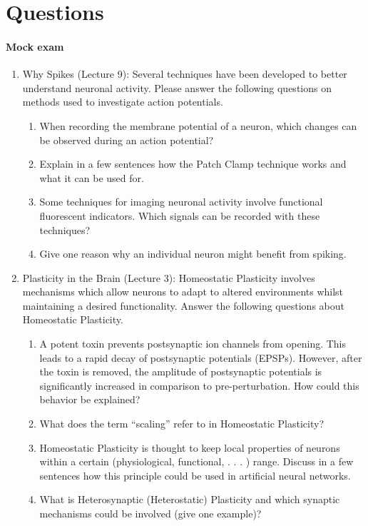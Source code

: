 \documentclass[main]{subfiles}
\begin{document}
\newpage
\appendix
\section{Questions}

\paragraph{Mock exam}


\begin{enumerate}
    \item Why Spikes (Lecture 9):
    Several techniques have been developed to better understand neuronal activity. Please answer the following questions on methods used to investigate action potentials.
  \begin{enumerate}[label*=\arabic*.]
    \item When recording the membrane potential of a neuron, which changes can be observed during an action potential?
    \item Explain in a few sentences how the Patch Clamp technique works and what it can be used for.
    \item Some techniques for imaging neuronal activity involve functional fluorescent indicators. Which signals can be recorded with these techniques?
    \item Give one reason why an individual neuron might benefit from spiking.
  \end{enumerate}

    \item Plasticity in the Brain (Lecture 3):
    Homeostatic Plasticity involves mechanisms which allow neurons to adapt to altered environments whilst maintaining a desired functionality. Answer the following questions about Homeostatic Plasticity.
  \begin{enumerate}[label*=\arabic*.]
    \item A potent toxin prevents postsynaptic ion channels from opening. This leads to a rapid decay of postsynaptic potentials (EPSPs). However, after the toxin is removed, the amplitude of postsynaptic potentials is significantly increased in comparison to pre-perturbation. How could this behavior be explained?
    \item What does the term “scaling” refer to in Homeostatic Plasticity?
    \item Homeostatic Plasticity is thought to keep local properties of neurons within a certain (physiological, functional, . . . ) range. Discuss in a few sentences how this principle could be used in artificial neural networks.
    \item What is Heterosynaptic (Heterostatic) Plasticity and which synaptic mechanisms could be involved (give one example)?
  \end{enumerate}


\end{enumerate}
\end{document}
